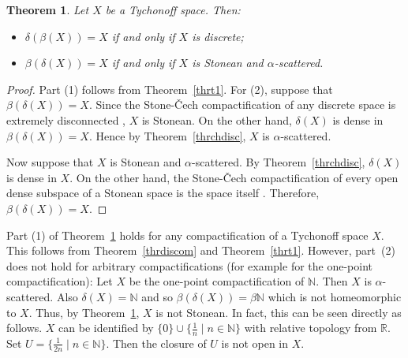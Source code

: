 \documentclass[manuscript]{amsart}
\newtheorem{theorem}{Theorem}[section]
\theoremstyle{definition}
\begin{document}
\begin{theorem}\label{thrdual}
Let $X$ be a Tychonoff space. Then:
\begin{itemize}
\item[(1)]
 $\delta(\beta(X))=X$ if and only if $X$ is discrete;
\item[(2)]
$\beta(\delta(X))=X$ if and only if $X$ is
 Stonean and $\alpha$-scattered.
\end{itemize}
\end{theorem}
\begin{proof}
Part (1) follows from Theorem~\ref{thrt1}. For (2),
suppose that $\beta(\delta(X))=X$. Since the Stone-\v{C}ech compactification
of any discrete space is extremely disconnected \cite[Theorem~6.2.7]{en89},
$X$ is Stonean. On the other hand,
$\delta(X)$ is dense in $\beta(\delta(X))=X$. Hence by Theorem~\ref{thrchdisc},
$X$ is $\alpha$-scattered.

Now suppose that $X$ is Stonean and $\alpha$-scattered.
By Theorem~\ref{thrchdisc}, $\delta(X)$ is dense in $X$.
On the other hand, the Stone-\v{C}ech compactification of
every open dense subspace of a Stonean space is the space itself \cite[Corollary~III.1.8]{ta79}.
Therefore, $\beta(\delta(X))=X$.
\end{proof}

Part (1) of Theorem~\ref{thrdual} holds for any compactification of
a Tychonoff space $X$. This follows from Theorem~\ref{thrdiscom} and Theorem~\ref{thrt1}.
However, part~(2) does not hold for arbitrary compactifications
(for example for the one-point compactification): Let $X$ be the one-point compactification of ${\mathbb{N}}$. Then $X$ is $\alpha$-scattered.
Also $\delta(X)= {\mathbb{N}}$  and so $\beta(\delta(X))=\beta {\mathbb{N}}$ which is not homeomorphic to $X$.
Thus, by Theorem~\ref{thrdual}, $X$ is not Stonean.
In fact, this can be seen directly as follows.
$X$ can be identified by $\{0\}\cup\{\frac{1}{n}\mid n\in{\mathbb{N}}\}$
with relative topology from ${\mathbb{R}}$. Set $U=\{\frac{1}{2n}\mid  n\in{\mathbb{N}}\}$.
Then the closure of $U$ is not open in $X$.
\end{document}
